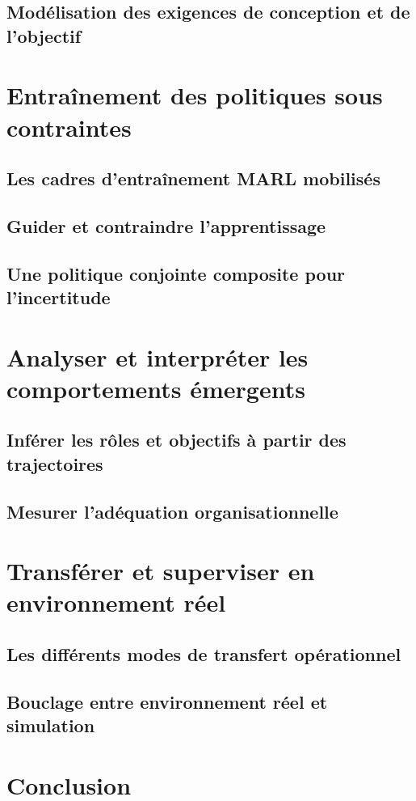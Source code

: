 \documentclass[ twoside,openright,titlepage,numbers=noenddot,headinclude,%
                footinclude=true,cleardoublepage=empty,abstractoff, %
                BCOR=5mm,paper=a4,fontsize=11pt,%
                french,american,%
                ]{scrreprt}
\begin{document}
\section{Modélisation des exigences de conception et de l'objectif}

\chapter{Entraînement des politiques sous contraintes}
\section{Les cadres d'entraînement MARL mobilisés}
\section{Guider et contraindre l'apprentissage}
\section{Une politique conjointe composite pour l'incertitude}

\chapter{Analyser et interpréter les comportements émergents}
\section{Inférer les rôles et objectifs à partir des trajectoires}
\section{Mesurer l'adéquation organisationnelle}

\chapter{Transférer et superviser en environnement réel}
\section{Les différents modes de transfert opérationnel}
\section{Bouclage entre environnement réel et simulation}

\chapter*{Conclusion}
\end{document}
